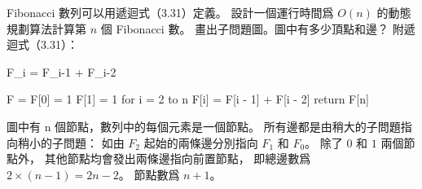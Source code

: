 \startEXERCISE
Fibonacci 數列可以用遞迴式（3.31）定義。
設計一個運行時間爲 $O(n)$ 的動態規劃算法計算第 $n$ 個 Fibonacci 數。
畫出子問題圖。圖中有多少頂點和邊？
附遞迴式（3.31）：

\startformula
F_i = \startmathcases
{} \NC {} \NR
{} \NC {} \NR
\NC F_{i-1} + F_{i-2} \NC {} \NR
\stopmathcases
\stopformula
\stopEXERCISE

\startANSWER
{}
\startCLRSCODE
F = 
F[0] = 1
F[1] = 1
for i = 2 to n
	F[i] = F[i - 1] + F[i - 2]
return F[n]
\stopCLRSCODE

圖中有 n 個節點，數列中的每個元素是一個節點。
所有邊都是由稍大的子問題指向稍小的子問題：
如由 $F_2$ 起始的兩條邊分別指向 $F_1$ 和 $F_0$。
除了 $0$ 和 $1$ 兩個節點外，
其他節點均會發出兩條邊指向前置節點，
即總邊數爲 $2\times(n-1)=2n-2$。
節點數爲 $n+1$。

\externalfigure[e14_1_6-1]
\stopANSWER
